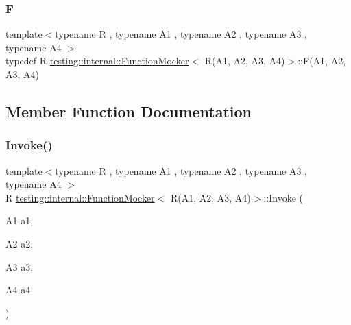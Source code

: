 \mbox{\label{classtesting_1_1internal_1_1FunctionMocker_3_01R_07A1_00_01A2_00_01A3_00_01A4_08_4_a9be04bb962edb1458c857ca8e9db9318}} 
\subsubsection{\texorpdfstring{F}{F}}
{\footnotesize\ttfamily template$<$typename R , typename A1 , typename A2 , typename A3 , typename A4 $>$ \\
typedef R \mbox{\hyperlink{classtesting_1_1internal_1_1FunctionMocker}{testing\+::internal\+::\+Function\+Mocker}}$<$ R(A1, A2, A3, A4)$>$\+::F(A1, A2, A3, A4)}



\subsection{Member Function Documentation}
\mbox{\label{classtesting_1_1internal_1_1FunctionMocker_3_01R_07A1_00_01A2_00_01A3_00_01A4_08_4_ac20228ed7a21f43775a08fb3b1661721}} 
\subsubsection{\texorpdfstring{Invoke()}{Invoke()}}
{\footnotesize\ttfamily template$<$typename R , typename A1 , typename A2 , typename A3 , typename A4 $>$ \\
R \mbox{\hyperlink{classtesting_1_1internal_1_1FunctionMocker}{testing\+::internal\+::\+Function\+Mocker}}$<$ R(A1, A2, A3, A4)$>$\+::Invoke (\begin{DoxyParamCaption}\item[{A1}]{a1,  }\item[{A2}]{a2,  }\item[{A3}]{a3,  }\item[{A4}]{a4 }\end{DoxyParamCaption})\hspace{0.3cm}{\ttfamily [inline]}}

